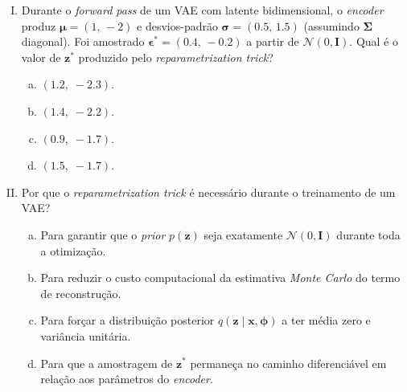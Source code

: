 \documentclass{dlproblemset}
\begin{document}
\begin{enumerate}[I)]
    \item Durante o \textit{forward pass} de um VAE com latente bidimensional, o \textit{encoder} produz $\boldsymbol{\mu} = (1,\, -2)$ e desvios-padrão $\boldsymbol{\sigma} = (0.5,\, 1.5)$ (assumindo $\boldsymbol{\Sigma}$ diagonal). Foi amostrado $\boldsymbol{\epsilon}^{*} = (0.4,\, -0.2)$ a partir de $\mathcal{N}(0, \mathbf{I})$. Qual é o valor de $\mathbf{z}^{*}$ produzido pelo \textit{reparametrization trick}?
    \begin{enumerate}[(a)]
        \item $(1.2,\; -2.3)$.
        \item $(1.4,\; -2.2)$.
        \item $(0.9,\; -1.7)$.
        \item $(1.5,\; -1.7)$.
    \end{enumerate}

    \item Por que o \textit{reparametrization trick} é necessário durante o treinamento de um VAE?
    \begin{enumerate}[(a)]
        \item Para garantir que o \textit{prior} $p(\mathbf{z})$ seja exatamente $\mathcal{N}(0, \mathbf{I})$ durante toda a otimização.
        \item Para reduzir o custo computacional da estimativa \textit{Monte Carlo} do termo de reconstrução.
        \item Para forçar a distribuição posterior $q(\mathbf{z} \mid \mathbf{x}, \boldsymbol{\phi})$ a ter média zero e variância unitária.
        \item Para que a amostragem de $\mathbf{z}^{*}$ permaneça no caminho diferenciável em relação aos parâmetros do \textit{encoder}.
    \end{enumerate}


\end{enumerate}
\end{document}
